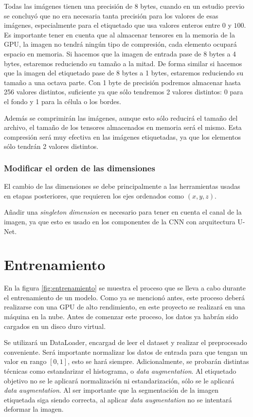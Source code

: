 Todas las imágenes tienen una precisión de 8 bytes, cuando en un estudio previo se concluyó que no era necesaria tanta precisión para los valores de esas imágenes, especialmente para el etiquetado que usa valores enteros entre $0$ y $100$. Es importante tener en cuenta que al almacenar tensores en la memoria de la GPU, la imagen no tendrá ningún tipo de compresión, cada elemento ocupará espacio en memoria. Si hacemos que la imagen de entrada pase de 8 bytes a 4 bytes, estaremos reduciendo su tamaño a la mitad. De forma similar si hacemos que la imagen del etiquetado pase de 8 bytes a 1 bytes, estaremos reduciendo su tamaño a una octava parte. Con 1 byte de precisión podremos almacenar hasta 256 valores distintos, suficiente ya que sólo tendremos 2 valores distintos: 0 para el fondo y 1 para la célula o los bordes.

Además se comprimirán las imágenes, aunque esto sólo reducirá el tamaño del archivo, el tamaño de los tensores almacenados en memoria será el mismo. Esta compresión será muy efectiva en las imágenes etiquetadas, ya que los elementos sólo tendrán 2 valores distintos.

\subsubsection{Modificar el orden de las dimensiones}

El cambio de las dimensiones se debe principalmente a las herramientas usadas en etapas posteriores, que requieren los ejes ordenados como $(x,y,z)$.

Añadir una \textit{singleton dimension} es necesario para tener en cuenta el canal de la imagen, ya que esto es usado en los componentes de la CNN con arquitectura U-Net.

\pagebreak \section{Entrenamiento}\label{sec:entrenamiento}


En la figura \ref{fig:entrenamiento} se muestra el proceso que se lleva a cabo durante el entrenamiento de un modelo. Como ya se mencionó antes, este proceso deberá realizarse con una GPU de alto rendimiento, en este proyecto se realizará en una máquina en la nube. Antes de comenzar este proceso, los datos ya habrán sido cargados en un disco duro virtual.

Se utilizará un DataLoader, encargad de leer el dataset y realizar el preprocesado conveniente. Será importante normalizar los datos de entrada para que tengan un valor en rango $ [0, 1] $, esto se hará siempre. Adicionalmente, se probarán distintas técnicas como estandarizar el histograma, o \textit{data augmentation}. Al etiquetado objetivo no se le aplicará normalización ni estandarización, sólo se le aplicará \textit{data augmentation}. Al ser importante que la segmentación de la imagen etiquetada siga siendo correcta, al aplicar \textit{data augmentation} no se intentará deformar la imagen.

